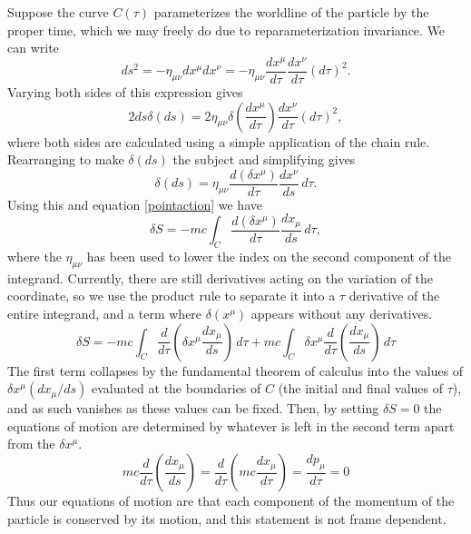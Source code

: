 \documentclass[a4paper,12pt]{article}
\numberwithin{equation}{section}
\begin{document}
Suppose the curve $C(\tau)$ parameterizes the worldline of the particle by the proper time, which we may freely do due to reparameterization invariance. We can write
\begin{equation}
ds^2 = -\eta_{\mu \nu} dx^\mu dx^\nu = -\eta_{\mu \nu} \frac{dx^\mu}{d\tau}\frac{dx^\nu}{d\tau}(d\tau)^2.
\end{equation}
Varying both sides of this expression gives
\begin{equation}
2ds\delta(ds)=2\eta_{\mu \nu} \delta\left(\frac{dx^\mu}{d\tau}\right)\frac{dx^\nu}{d\tau}(d\tau)^2,
\end{equation}
where both sides are calculated using a simple application of the chain rule. Rearranging to make $\delta(ds)$ the subject and simplifying gives
\begin{equation}
\delta(ds) = \eta_{\mu \nu} \frac{d(\delta x^\mu)}{d\tau}\frac{dx^\nu}{ds}\,d\tau.
\end{equation}
Using this and equation \ref{pointaction} we have
\begin{equation}
\delta S = -mc\int_C \frac{d(\delta x^\mu)}{d\tau}\frac{dx_\mu}{ds}\,d\tau,
\end{equation}
where the $\eta_{\mu \nu}$ has been used to lower the index on the second component of the integrand.
Currently, there are still derivatives acting on the variation of the coordinate, so we use the product rule to separate it into a $\tau$ derivative of the entire integrand, and a term where $\delta(x^\mu)$ appears without any derivatives.
\begin{equation}\label{pointseparated}
\delta S = -mc\int_C \frac{d}{d\tau}\left(\delta x^\mu \frac{dx_\mu}{ds}\right)\,d\tau + mc\int_C\delta x^\mu \frac{d}{d\tau}\left(\frac{dx_\mu}{ds}\right) \, d\tau
\end{equation}
The first term collapses by the fundamental theorem of calculus into the values of $\delta x^\mu (dx_\mu/ds)$ evaluated at the boundaries of $C$ (the initial and final values of $\tau$), and as such vanishes as these values can be fixed. Then, by setting $\delta S = 0$ the equations of motion are determined by whatever is left in the second term apart from the $\delta x^\mu$.
\begin{equation}
mc\frac{d}{d\tau}\left(\frac{dx_\mu}{ds}\right) = \frac{d}{d\tau}\left(mc\frac{dx_\mu}{d\tau}\right) = \frac{dp_\mu}{d\tau} = 0
\end{equation}
Thus our equations of motion are that each component of the momentum of the particle is conserved by its motion, and this statement is not frame dependent.
\end{document}
